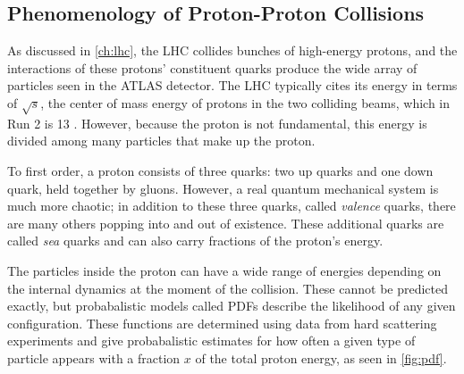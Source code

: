 




\subsection{Phenomenology of Proton-Proton Collisions}
\label{sec:pp_collisions}

As discussed in \autoref{ch:lhc}, the \ac{LHC} collides bunches of high-energy protons, and the interactions of these protons' constituent quarks produce the wide array of particles seen in the ATLAS detector. The \ac{LHC} typically cites its energy in terms of $\sqrt{s}$, the center of mass energy of protons in the two colliding beams, which in Run 2 is 13 \tev. However, because the proton is not fundamental, this energy is divided among many particles that make up the proton. 

To first order, a proton consists of three quarks: two up quarks and one down quark, held together by gluons. However, a real quantum mechanical system is much more chaotic; in addition to these three quarks, called \textit{valence} quarks, there are many others popping into and out of existence. These additional quarks are called \textit{sea} quarks and can also carry fractions of the proton's energy.

The particles inside the proton can have a wide range of energies depending on the internal dynamics at the moment of the collision. These cannot be predicted exactly, but probabalistic models called \acfp{PDF} describe the likelihood of any given configuration. These functions are determined using data from hard scattering experiments and give probabalistic estimates for how often a given type of particle appears with a fraction $x$ of the total proton energy, as seen in \autoref{fig:pdf}. 

